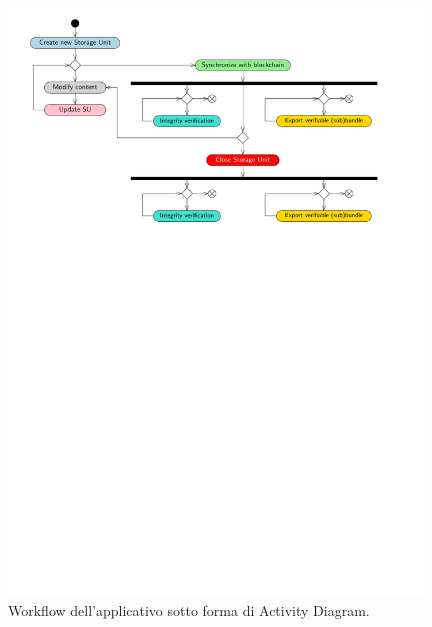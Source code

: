 \begin{figure}[H]
    \centering
    \includegraphics[width=0.98\textwidth]{Figures/activityDiag}
    \caption{\small{
    Workflow dell’applicativo sotto forma di Activity Diagram.
    } %
    } %
    \label{fi:workflow}
\end{figure}

